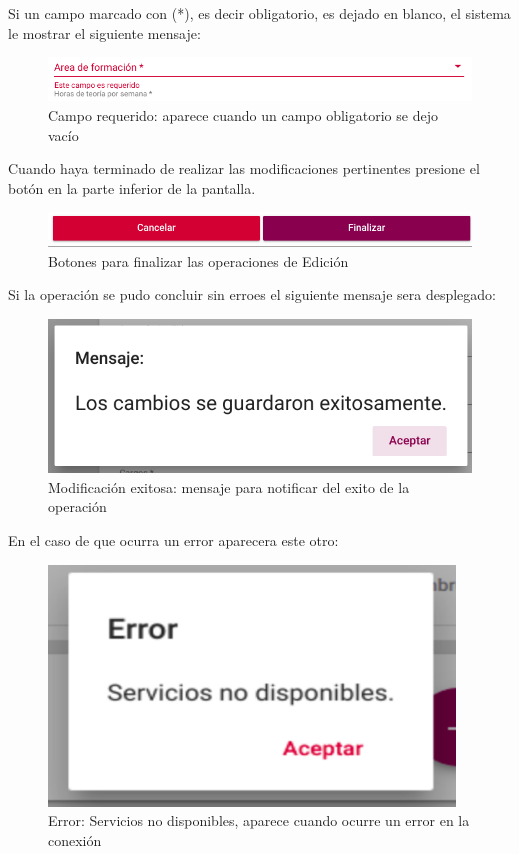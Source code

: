 Si un campo  marcado con (*), es decir obligatorio, es dejado en blanco, el sistema le mostrar el siguiente mensaje:\\
\begin{figure}[H]
    \centering
    \hypertarget{requeridoE}{\includegraphics[width=0.7\linewidth]{images/GUA/requerido}}
    \caption{Campo requerido: aparece cuando un campo obligatorio se dejo vacío}
    \label{requeridoE}
\end{figure}
Cuando haya terminado de realizar las modificaciones pertinentes presione el botón  en la parte inferior de la pantalla.\\
\begin{figure}[H]
    \centering
    \hypertarget{finalizarBtnE}{\includegraphics[width=0.7\linewidth]{images/GUA/finalizarBtn}}
    \caption{Botones para finalizar las operaciones de Edición}
    \label{finalizarBtnE}
\end{figure}
Si la operación se pudo concluir sin erroes el siguiente mensaje sera desplegado:\\
\begin{figure}[H]
    \centering
    \hypertarget{modificacion}{\includegraphics[width=0.7\linewidth]{images/GUA/modificacion}}
    \caption{Modificación exitosa: mensaje para notificar del exito de la operación}
    \label{modificacion}
\end{figure}
En el caso de que ocurra un error aparecera este otro:\\
\begin{figure}[H]
    \centering
    \hypertarget{errorE}{\includegraphics[width=0.7\linewidth]{images/GUA/error}}
    \caption{Error: Servicios no disponibles, aparece cuando ocurre un error en la conexión}
    \label{errorE}
\end{figure}
